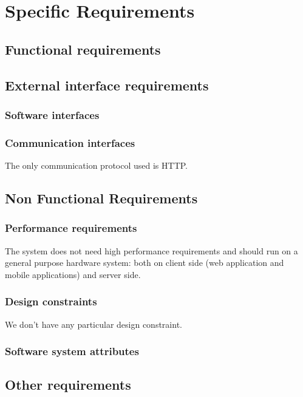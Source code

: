 \chapter{Specific Requirements}
\section{Functional requirements}


\section{External interface requirements}

\subsection{Software interfaces}

\subsection{Communication interfaces}
The only communication protocol used is HTTP.


\section{Non Functional Requirements}
\subsection{Performance requirements}
The system does not need high performance requirements and should run on a general purpose hardware system: both on client side (web application and mobile applications) and server side.
\subsection{Design constraints}
We don't have any particular design constraint.
\subsection{Software system attributes}
\section{Other requirements}